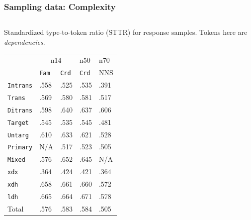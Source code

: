 \documentclass[handout,xcolor={dvipsnames}]{beamer}
\newcommand{\param}[1]{\texttt{#1}}
\begin{document}
\begin{frame}
\frametitle{Sampling data: Complexity}
\small

\begin{columns}
\begin{column}{0.6\textwidth}
\begin{center}
\small
Standardized type-to-token ratio (STTR) for response samples. Tokens here are \textit{dependencies}. \\
\end{center}
\vspace{-1em}
\begin{table}[htb!]
\begin{center}
\setlength{\tabcolsep}{.5em}
\begin{tabular}{|l||l|l|l||l|}
\hline
 	& \multicolumn{2}{c|}{n14} & n50 & n70 \\
\cline{2-5}
   	& \param{Fam} & \param{Crd} & \param{Crd} 			& NNS			\\ \hline
\hline
\param{Intrans} & .558 	  		& .525 			& .535 		& .391 		\\ \hline
\param{Trans}   & .569        	& .580          & .581      & .517    	    \\ \hline
\param{Ditrans} & .598        	& .640          & .637      & .606    	    \\ 
\hline
\hline
\param{Target}  & .545 			& .535	 		& .545 		& .481			\\ \hline
\param{Untarg}  & .610        	& .633        	& .621    	& .528        	\\ \hline
\hline
\param{Prim\-a\-ry} & N/A       & .517 			& .523		& .505		 	\\ \hline
\param{Mix\-ed}   & .576        & .652          & .645      & N/A	        \\ \hline
\hline
\param{xdx}     & .364			& .424 			& .421		& .364			\\ \hline
\param{xdh}     & .658        	& .661          & .660      & .572	        \\ \hline
\param{ldh}     & .665        	& .664          & .671      & .578	        \\ \hline
\hline
Total    		& .576        	& .583         	& .584    	& .505	        \\ \hline
\end{tabular}
\end{center}
\end{table}

\end{column}


\end{columns}
\end{frame}
\end{document}
